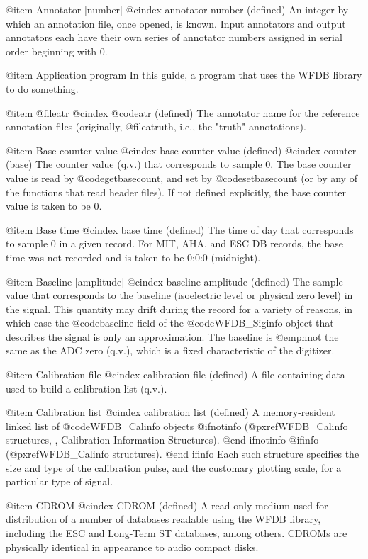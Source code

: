 {{{{{{{{@item Annotator [number]
@cindex annotator number (defined)
An integer by which an annotation file, once opened, is known.  Input
annotators and output annotators each have their own series of annotator
numbers assigned in serial order beginning with 0.

@item Application program
In this guide, a program that uses the WFDB library to do
something.

@item @file{atr}
@cindex @code{atr} (defined)
The annotator name for the reference annotation files (originally,
@file{atruth}, i.e., the "truth" annotations).

@item Base counter value
@cindex base counter value (defined)
@cindex counter (base)
The counter value (q.v.) that corresponds to sample 0.  The base
counter value is read by @code{getbasecount}, and set by @code{setbasecount}
(or by any of the functions that read header files).  If not
defined explicitly, the base counter value is taken to be 0.

@item Base time
@cindex base time (defined)
The time of day that corresponds to sample 0 in a given record.  For
MIT, AHA, and ESC DB records, the base time was not recorded and is taken to
be 0:0:0 (midnight).

@item Baseline [amplitude]
@cindex baseline amplitude (defined)
The sample value that corresponds to the baseline (isoelectric level or
physical zero level) in the signal.  This quantity may drift during the
record for a variety of reasons, in which case the @code{baseline} field
of the @code{WFDB_Siginfo} object that describes the signal is only an
approximation.  The baseline is @emph{not} the same as the ADC zero
(q.v.), which is a fixed characteristic of the digitizer.

@item Calibration file
@cindex calibration file (defined)
A file containing data used to build a calibration list (q.v.).

@item Calibration list
@cindex calibration list (defined)
A memory-resident linked list of @code{WFDB_Calinfo} objects
@ifnotinfo
(@pxref{WFDB_Calinfo structures, , Calibration Information Structures}).
@end ifnotinfo
@ifinfo
(@pxref{WFDB_Calinfo structures}).
@end ifinfo
Each such structure specifies the size and type of the calibration pulse,
and the customary plotting scale, for a particular type of signal.

@item CDROM
@cindex CDROM (defined)
A read-only medium used for distribution of a number of databases
readable using the WFDB library, including the ESC and Long-Term ST
databases, among others.  CDROMs are physically identical in
appearance to audio compact disks.

}}}}}}}}
